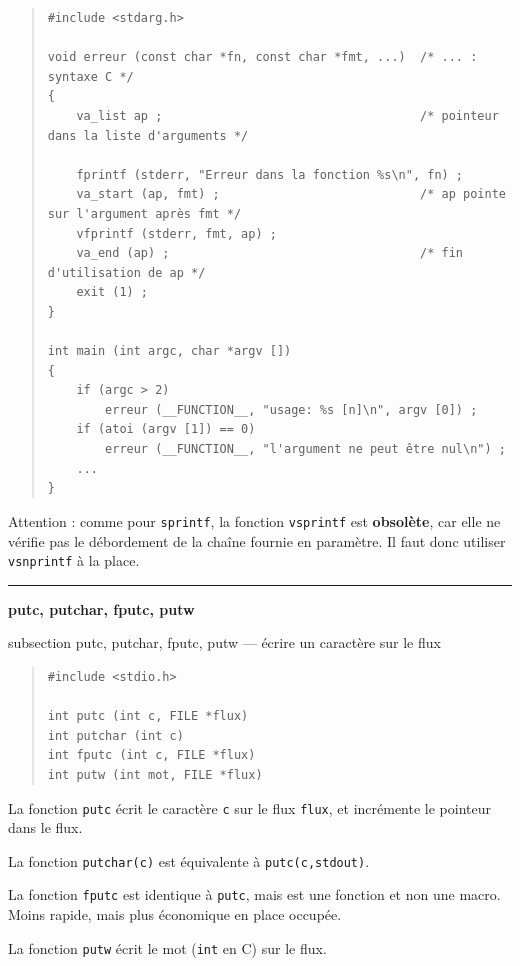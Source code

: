 \documentclass [twoside] {report}
\newcommand {\primitive} [1]
    {
	\phantomsection
	{\large \textbf {#1}}
	\addcontentsline {toc} {subsection} {#1}
    }
\newcommand {\separation}
    {
	\vspace {5mm}
	\nopagebreak
	\hrule
    }
\begin{document}
\begin {quote}
\small
\begin {verbatim}
#include <stdarg.h>

void erreur (const char *fn, const char *fmt, ...)  /* ... : syntaxe C */
{
    va_list ap ;                                    /* pointeur dans la liste d'arguments */

    fprintf (stderr, "Erreur dans la fonction %
    va_start (ap, fmt) ;                            /* ap pointe sur l'argument après fmt */
    vfprintf (stderr, fmt, ap) ;
    va_end (ap) ;                                   /* fin d'utilisation de ap */
    exit (1) ;
}

int main (int argc, char *argv [])
{
    if (argc > 2)
        erreur (__FUNCTION__, "usage: %
    if (atoi (argv [1]) == 0)
        erreur (__FUNCTION__, "l'argument ne peut être nul\n") ;
    ...
}
\end{verbatim}
\end {quote}

Attention : comme pour \texttt {sprintf}, la fonction \texttt {vsprintf}
est \textbf {obsolète}, car elle ne vérifie pas le débordement de la
chaîne fournie en paramètre. Il faut donc utiliser \texttt {vsnprintf}
à la place.


\separation
\primitive {putc, putchar, fputc, putw} --- écrire un caractère sur le flux

\begin {quote}
\begin {verbatim}
#include <stdio.h>

int putc (int c, FILE *flux)
int putchar (int c)
int fputc (int c, FILE *flux)
int putw (int mot, FILE *flux)
\end{verbatim}
\end {quote}

La fonction \texttt {putc} écrit le caractère \texttt {c} sur le flux
\texttt {flux}, et incrémente le pointeur dans le flux.

La fonction \texttt {putchar(c)} est équivalente à \texttt {putc(c,stdout)}.

La fonction \texttt {fputc} est identique à \texttt {putc}, mais est une
fonction et non une macro. Moins rapide, mais plus
économique en place occupée.

La fonction \texttt {putw} écrit le mot (\texttt {int} en C) sur le flux.
\end{document}
